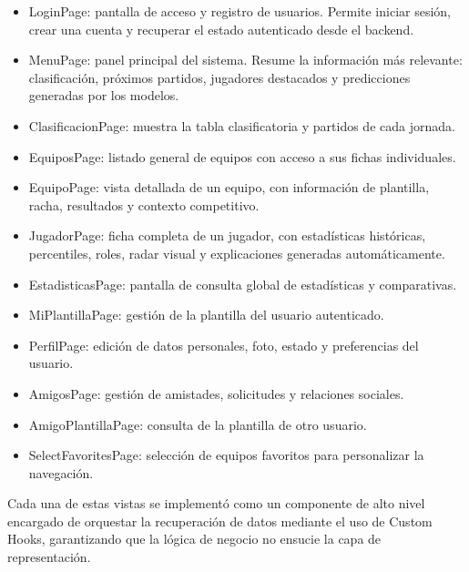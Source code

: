 \begin{itemize}
\item LoginPage: pantalla de acceso y registro de usuarios. Permite iniciar sesión, crear una cuenta y recuperar el estado autenticado desde el backend.
 
\item MenuPage: panel principal del sistema. Resume la información más relevante: clasificación, próximos partidos, jugadores destacados y predicciones generadas por los modelos.
 
\item ClasificacionPage: muestra la tabla clasificatoria y partidos de cada jornada.
 
\item EquiposPage: listado general de equipos con acceso a sus fichas individuales.
 
\item EquipoPage: vista detallada de un equipo, con información de plantilla, racha, resultados y contexto competitivo.
 
\item JugadorPage: ficha completa de un jugador, con estadísticas históricas, percentiles, roles, radar visual y explicaciones generadas automáticamente.
 
\item EstadisticasPage: pantalla de consulta global de estadísticas y comparativas.
 
\item MiPlantillaPage: gestión de la plantilla del usuario autenticado.
 
\item PerfilPage: edición de datos personales, foto, estado y preferencias del usuario.
 
\item AmigosPage: gestión de amistades, solicitudes y relaciones sociales.
 
\item AmigoPlantillaPage: consulta de la plantilla de otro usuario.
 
\item SelectFavoritesPage: selección de equipos favoritos para personalizar la navegación.
\end{itemize}
 
Cada una de estas vistas se implementó como un componente de alto nivel encargado de orquestar la recuperación de datos mediante el uso de Custom Hooks,
garantizando que la lógica de negocio no ensucie la capa de representación.
 
